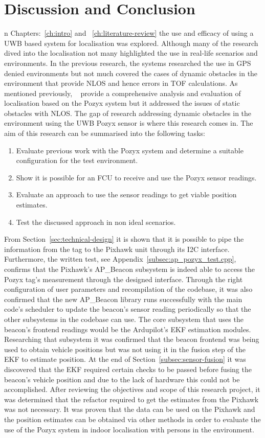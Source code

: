 \chapter{Discussion and Conclusion}\label{ch:discussion}
n Chapters:~\ref{ch:intro} and ~\ref{ch:literature-review} the use and efficacy of using a UWB based system for localisation was explored.
Although many of the research dived into the localisation not many highlighted the use in real-life scenarios and environments.
In the previous research, the systems researched the use in GPS denied environments but not much covered the cases of dynamic obstacles in the environment that provide NLOS and hence errors in TOF calculations.
As mentioned previously, ~\citet{evaluwb} provide a comprehensive analysis and evaluation of localisation based on the Pozyx system but it addressed the issues of static obstacles with NLOS.
The gap of research addressing dynamic obstacles in the environment using the UWB Pozyx sensor is where this research comes in.
The aim of this research can be summarised into the following tasks:
\begin{enumerate}
    \item Evaluate previous work with the Pozyx system and determine a suitable configuration for the test environment.
    \item Show it is possible for an FCU to receive and use the Pozyx sensor readings.
    \item Evaluate an approach to use the sensor readings to get viable position estimates.
    \item Test the discussed approach in non ideal scenarios.
\end{enumerate}

From Section~\ref{sec:technical-design} it is shown that it is possible to pipe the information from the tag to the Pixhawk unit through its I2C interface.
Furthermore, the written test, see Appendix~\ref{subsec:ap_pozyx_test.cpp}, confirms that the Pixhawk's AP\_Beacon subsystem is indeed able to access the Pozyx tag's measurement through the designed interface.
Through the right configuration of user parameters and recompilation of the codebase, it was also confirmed that the new AP\_Beacon library runs successfully with the main code's scheduler to update the beacon's sensor reading periodically so that the other subsystems in the codebase can use.
The core subsystem that uses the beacon's frontend readings would be the Ardupilot's EKF estimation modules.
Researching that subsystem it was confirmed that the beacon frontend was being used to obtain vehicle positions but was not using it in the fusion step of the EKF to estimate position.
At the end of Section~\ref{subsec:sensor-fusion} it was discovered that the EKF required certain checks to be passed before fusing the beacon's  vehicle position and due to the lack of hardware this could not be accomplished.
After reviewing the objectives and scope of this research project, it was determined that the refactor required to get the estimates from the Pixhawk was not necessary.
It was proven that the data can be used on the Pixhawk and the position estimates can be obtained via other methods in order to evaluate the use of the Pozyx system in indoor localisation with persons in the environment.

